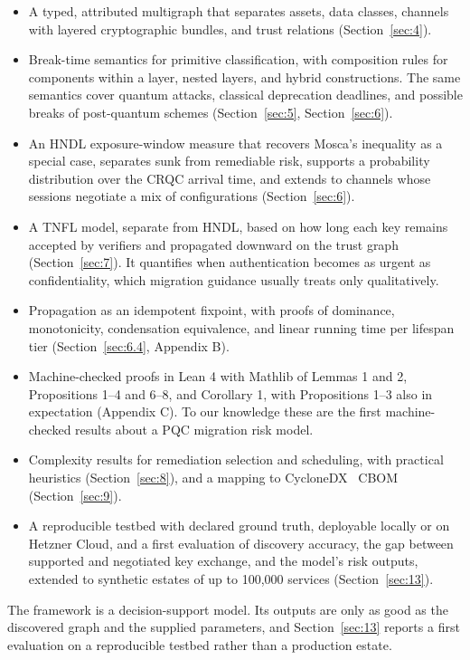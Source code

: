 \documentclass[conference]{IEEEtran}
\begin{document}
\begin{itemize}
\item A typed, attributed multigraph that separates assets, data classes, channels with layered cryptographic bundles, and trust relations (Section~\ref{sec:4}).
\item Break-time semantics for primitive classification, with composition rules for components within a layer, nested layers, and hybrid constructions. The same semantics cover quantum attacks, classical deprecation deadlines, and possible breaks of post-quantum schemes (Section~\ref{sec:5}, Section~\ref{sec:6}).
\item An HNDL exposure-window measure that recovers Mosca's inequality as a special case, separates sunk from remediable risk, supports a probability distribution over the CRQC arrival time, and extends to channels whose sessions negotiate a mix of configurations (Section~\ref{sec:6}).
\item A TNFL model, separate from HNDL, based on how long each key remains accepted by verifiers and propagated downward on the trust graph (Section~\ref{sec:7}). It quantifies when authentication becomes as urgent as confidentiality, which migration guidance usually treats only qualitatively.
\item Propagation as an idempotent fixpoint, with proofs of dominance, monotonicity, condensation equivalence, and linear running time per lifespan tier (Section~\ref{sec:6.4}, Appendix B).
\item Machine-checked proofs in Lean 4 with Mathlib of Lemmas 1 and 2, Propositions 1–4 and 6–8, and Corollary 1, with Propositions 1–3 also in expectation (Appendix C). To our knowledge these are the first machine-checked results about a PQC migration risk model.
\item Complexity results for remediation selection and scheduling, with practical heuristics (Section~\ref{sec:8}), and a mapping to CycloneDX~\cite{cyclonedx16} CBOM (Section~\ref{sec:9}).
\item A reproducible testbed with declared ground truth, deployable locally or on Hetzner Cloud, and a first evaluation of discovery accuracy, the gap between supported and negotiated key exchange, and the model's risk outputs, extended to synthetic estates of up to 100,000 services (Section~\ref{sec:13}).
\end{itemize}

The framework is a decision-support model. Its outputs are only as good as the discovered graph and the supplied parameters, and Section~\ref{sec:13} reports a first evaluation on a reproducible testbed rather than a production estate.
\end{document}
